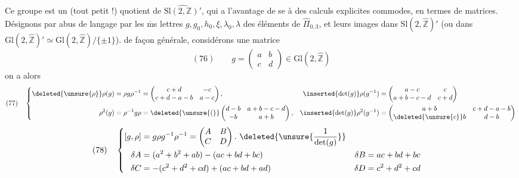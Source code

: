Ce groupe est un (tout petit !) quotient de $\widehat{\mathrm{Sl}(2,\mathbb Z)'}$, qui a l'avantage de se  à des calculs  explicites commodes, en termes de matrices. Désignons par abus de langage par les $\overline{\mathrm m}$s lettres $g,g_0,h_0,\xi,\lambda_0,\lambda$ des éléments de  $\widehat{\Pi}_{0,3}$,  et leurs images dans  $\mathrm{Sl}(2,\widehat{\mathbb Z})'$  (ou dans $\mathrm{Gl}(2,\widehat{\mathbb Z})'\simeq\mathrm{Gl}(2,\widehat{\mathbb Z})/\{\pm1\}$).   de façon générale, considérons une matrice
\[
(76)\qquad g=\begin{pmatrix}a&b\\c&d\end{pmatrix}\in\mathrm{Gl}(2,\widehat{\mathbb Z})
\]
on a alors
\[
(77)\quad
\left\{\begin{aligned}
\deleted{\unsure{\rho}}\rho(g)&=\rho g\rho^{-1}=\begin{pmatrix}c+d&-c\\c+d-a-b&a-c\end{pmatrix},
&\inserted{\det(g)}\rho(g^{-1})&=\begin{pmatrix}a-c&c\\a+b-c-d&c+d\end{pmatrix}\\
\rho^2(g)&=\rho^{-1}g\rho=\deleted{\unsure{(}}\begin{pmatrix}d-b&a+b-c-d\\-b&a+b\end{pmatrix},
&\inserted{\det(g)}\rho^2(g^{-1})&=\begin{pmatrix}a+b&c+d-a-b\\\deleted{\unsure{c}}b&d-b\end{pmatrix}
\end{aligned}\right.
\]
\[
(78)\quad
\left\{\begin{aligned}
\relax[g,\rho]&=g\rho g^{-1}\rho^{-1}=\begin{pmatrix}A&B\\C&D\end{pmatrix}.\ \deleted{\unsure{\frac{1}{\det(g)}}}\\
\delta A&=(a^2+b^2+ab)-(ac+bd+bc)&\delta B&=ac+bd+bc\\
\delta C&=-(c^2+d^2+cd)+(ac+bd+ad)&\delta D&=c^2+d^2+cd
\end{aligned}\right.
\]

